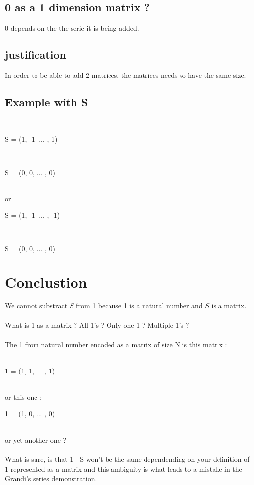 \documentclass{article}
\begin{document}
    \subsection{0 as a 1 dimension matrix ?}
      0 depends on the the serie it is being added.
    \subsection{justification}
      In order to be able to add 2 matrices, the matrices needs to have the same size.
    \subsection{Example with S}
      ~\\
      \centerline{
      S = (1, -1, ... , 1)
      }
      ~\\
      \centerline{
      S = (0,  0, ... , 0)
      }
      ~\\
      or
      ~\\
      \centerline{
      S = (1, -1, ... , -1)
      }
      ~\\
      \centerline{
      S = (0,  0, ... , 0)
      }
    \section{Conclustion}
      We cannot substract $S$ from 1 because 1 is a natural number and $S$ is a matrix.
      ~\\
      ~\\
      What is 1 as a matrix ? All 1's ? Only one 1 ? Multiple 1's ?
      ~\\
      ~\\
      The 1 from natural number encoded as a matrix of size N is this matrix :
      ~\\
      ~\\
      \centerline{
      1 = (1,  1, ... , 1)
      }
      ~\\
      or this one :
      ~\\
      \centerline{
      1 = (1,  0, ... , 0)
      }
      ~\\
      or yet another one ?
      ~\\
      ~\\
      What is sure, is that 1 - S won't be the same dependending on your definition of 1 represented as a matrix and this ambiguity is what leads to a mistake in the Grandi's series demonstration.
\end{document}
